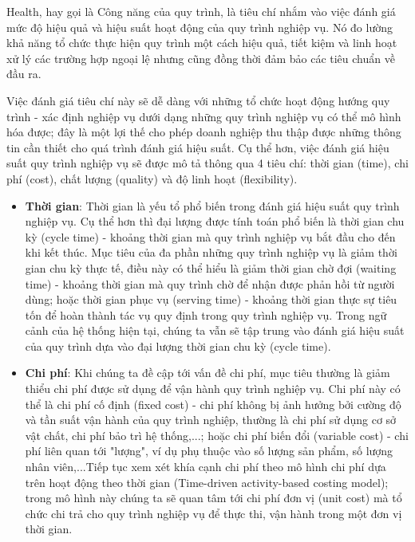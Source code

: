 Health, hay gọi là Công năng của quy trình, là tiêu chí nhắm vào việc đánh giá mức độ hiệu quả và hiệu suất hoạt động của quy trình nghiệp vụ. Nó đo lường khả năng tổ chức thực hiện quy trình một cách hiệu quả, tiết kiệm và linh hoạt xử lý các trường hợp ngoại lệ nhưng cũng đồng thời đảm bảo các tiêu chuẩn về đầu ra.

Việc đánh giá tiêu chí này sẽ dễ dàng với những tổ chức hoạt động hướng quy trình - xác định nghiệp vụ dưới dạng những quy trình nghiệp vụ có thể mô hình hóa được; đây là một lợi thế cho phép doanh nghiệp thu thập được những thông tin cần thiết cho quá trình đánh giá hiệu suất. Cụ thể hơn, việc đánh giá hiệu suất quy trình nghiệp vụ sẽ được mô tả thông qua 4 tiêu chí: thời gian (time), chi phí (cost), chất lượng (quality) và độ linh hoạt (flexibility).

\begin{itemize}
      \item \textbf{Thời gian}: Thời gian là yếu tổ phổ biến trong đánh giá hiệu suất quy trình nghiệp vụ. Cụ thể hơn thì đại lượng được tính toán phổ biến là thời gian chu kỳ (cycle time) - khoảng thời gian mà quy trình nghiệp vụ bắt đầu cho đến khi kết thúc. Mục tiêu của đa phần những quy trình nghiệp vụ là giảm thời gian chu kỳ thực tế, điều này có thể hiểu là giảm thời gian chờ đợi (waiting time) - khoảng thời gian mà quy trình chờ để nhận được phản hồi từ người dùng; hoặc thời gian phục vụ (serving time) - khoảng thời gian thực sự tiêu tốn để hoàn thành tác vụ quy định trong quy trình nghiệp vụ. Trong ngữ cảnh của hệ thống hiện tại, chúng ta vẫn sẽ tập trung vào đánh giá hiệu suất của quy trình dựa vào đại lượng thời gian chu kỳ (cycle time).
      \item \textbf{Chi phí}: Khi chúng ta đề cập tới vấn đề chi phí, mục tiêu thường là giảm thiểu chi phí được sử dụng để vận hành quy trình nghiệp vụ. Chi phí này có thể là chi phí cố định (fixed cost) - chi phí không bị ảnh hưởng bởi cường độ và tần suất vận hành của quy trình nghiệp, thường là chi phí sử dụng cơ sở vật chất, chi phí bảo trì hệ thống,...; hoặc chi phí biến đổi (variable cost) - chi phí liên quan tới "lượng", ví dụ phụ thuộc vào số lượng sản phẩm, số lượng nhân viên,...Tiếp tục xem xét khía cạnh chi phí theo mô hình chi phí dựa trên hoạt động theo thời gian (Time-driven activity-based costing model); trong mô hình này chúng ta sẽ quan tâm tới chi phí đơn vị (unit cost) mà tổ chức chi trả cho quy trình nghiệp vụ để thực thi, vận hành trong một đơn vị thời gian.

\end{itemize}

